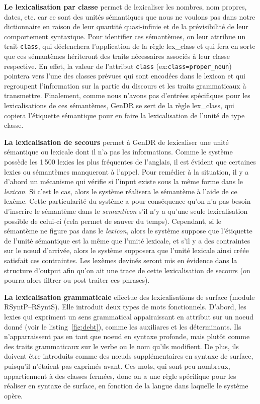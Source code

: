 \textbf{Le lexicalisation par classe} permet de lexicaliser les nombres, nom propres, dates, etc. car ce sont des unités sémantiques que nous ne voulons pas dans notre dictionnaire en raison de leur quantité quasi-infinie et de la prévisibilité de leur comportement syntaxique. Pour identifier ces sémantèmes, on leur attribue un trait \texttt{class}, qui déclenchera l'application de la règle lex\_class et qui fera en sorte que ces sémantèmes hériteront des traits nécessaires associés à leur classe respective. En effet, la valeur de l'attribut \texttt{class} (ex:\texttt{class=proper\_noun}) pointera vers l'une des classes prévues qui sont encodées dans le lexicon et qui regroupent l'information sur la partie du discours et les traits grammaticaux à transmettre. Finalement, comme nous n'avons pas d'entrées spécifiques pour les lexicalisations de ces sémantèmes, GenDR se sert de la règle lex\_class, qui copiera l'étiquette sémantique pour en faire la lexicalisation de l'unité de type classe.

\textbf{La lexicalisation de secours} 
permet à GenDR de lexicaliser une unité sémantique ou lexicale dont il n'a pas les informations. Comme le système possède les 1\,500 lexies les plus fréquentes de l'anglais, il est évident que certaines lexies ou sémantèmes manqueront à l'appel. Pour remédier à la situation, il y a d'abord un mécanisme qui vérifie si l'input existe sous la même forme dans le \emph{lexicon}. Si c'est le cas, alors le système réalisera le sémantème à l'aide de ce lexème. Cette particularité du système a pour conséquence qu'on n'a pas besoin d'inscrire le sémantème dans le \emph{semanticon} s'il n'y a qu'une seule lexicalisation possible de celui-ci (cela permet de sauver du temps). Cependant, si le sémantème ne figure pas dans le \emph{lexicon}, alors le système suppose que l'étiquette de l'unité sémantique est la même que l'unité lexicale, et s'il y a des contraintes sur le n\oe{}ud d'arrivée, alors le système supposera que l'unité lexicale ainsi créée satisfait ces contraintes. Les lexèmes devinés seront mis en évidence dans la structure d'output afin qu'on ait une trace de cette lexicalisation de secours (on pourra alors filtrer ou post-traiter ces phrases).

\textbf{La lexicalisation grammaticale}
effectue des lexicalisations de surface (module \ac{RSyntP}--\ac{RSyntS}). Elle introduit deux types de mots fonctionnels. D'abord, les lexies qui expriment un sens grammatical appairaissant en attribut sur un noeud donné (voir le listing~\ref{fig:debt}), comme les auxiliares et les déterminants. Ils n'apparraissent pas en tant que noeud en syntaxe profonde, mais plutôt comme des traits grammaticaux sur le verbe ou le nom qu'ils modifient. De plus, ils doivent être introduits comme des n\oe{}uds supplémentaires en syntaxe de surface, puisqu'il n'étaient pas exprimés avant. Ces mots, qui sont peu nombreux, appartiennent à des classes fermées, donc on a une règle spécifique pour les réaliser en syntaxe de surface, en fonction de la langue dans laquelle le système opère.

